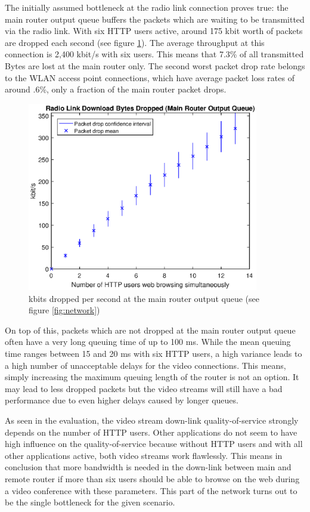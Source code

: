 \documentclass[a4paper,10pt]{book}\usepackage{graphicx}
\begin{document}
The initially assumed bottleneck at the radio link connection proves true: the main router output queue buffers the packets which are waiting to be transmitted via the radio link. With six HTTP users active, around 175 kbit worth of packets are dropped each second (see figure \ref{fig:onMainRouterDrops}). The average throughput at this connection is 2,400 kbit/s with six users. This means that 7.3\% of all transmitted Bytes are lost at the main router only. The second worst packet drop rate belongs to the WLAN access point connections, which have average packet loss rates of around .6\%, only a fraction of the main router packet drops.

\begin{figure}[!ht]
  \begin{center}
    \includegraphics[width=0.9\textwidth]{on_main_router_drops.eps}
    \caption{kbits dropped per second at the main router output queue (see figure \ref{fig:network})}
    \label{fig:onMainRouterDrops}
    \end{center}
\end{figure}

On top of this, packets which are not dropped at the main router output queue often have a very long queuing time of up to 100 ms. While the mean queuing time ranges between 15 and 20 ms with six HTTP users, a high variance leads to a high number of unacceptable delays for the video connections. This means, simply increasing the maximum queuing length of the router is not an option. It may lead to less dropped packets but the video streams will still have a bad performance due to even higher delays caused by longer queues.

As seen in the evaluation, the video stream down-link quality-of-service strongly depends on the number of HTTP users. Other applications do not seem to have high influence on the quality-of-service because without HTTP users and with all other applications active, both video streams work flawlessly. This means in conclusion that more bandwidth is needed in the down-link between main and remote router if more than six users should be able to browse on the web during a video conference with these parameters. This part of the network turns out to be the single bottleneck for the given scenario. 


	
	
\end{document}

